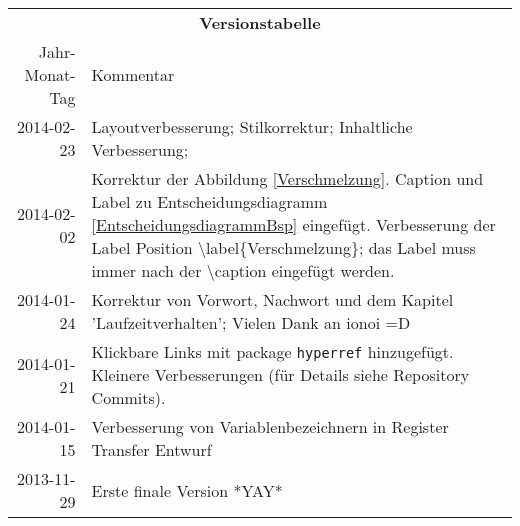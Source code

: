 \begin{table}[htp]
\centering
\begin{tabularx}{\columnwidth}{rp{}}
\multicolumn{2}{c}{\textbf{Versionstabelle}} \\
Jahr-Monat-Tag & Kommentar \\ \hline
2014-02-23 & Layoutverbesserung;
Stilkorrektur; 
Inhaltliche Verbesserung;
\\
2014-02-02 & Korrektur der Abbildung \ref{Verschmelzung}.
Caption und Label zu Entscheidungsdiagramm \ref{EntscheidungsdiagrammBsp} eingefügt.
Verbesserung der Label Position \textbackslash label\{Verschmelzung\}; das Label muss immer nach der \textbackslash caption eingefügt werden.
\\
2014-01-24 & Korrektur von Vorwort, Nachwort und dem Kapitel 'Laufzeitverhalten'; Vielen Dank an ionoi =D \\
2014-01-21 & Klickbare Links mit package \texttt{hyperref} hinzugefügt.
                     Kleinere Verbesserungen (für Details siehe Repository Commits).
\\
2014-01-15 & Verbesserung von Variablenbezeichnern in Register Transfer Entwurf \\
2013-11-29 & Erste finale Version *YAY* \\
\end{tabularx}
\end{table}